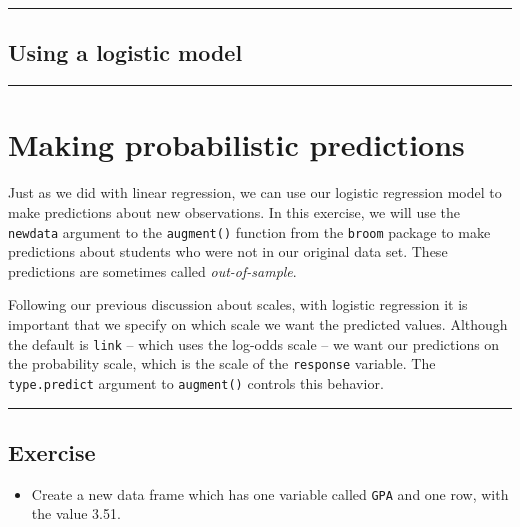 \documentclass[
]{book}
\providecommand{\tightlist}{%
  \setlength{\itemsep}{0pt}\setlength{\parskip}{0pt}}
\begin{document}
\begin{center}\rule{0.5\linewidth}{0.5pt}\end{center}

\hypertarget{using-a-logistic-model}{%
\subsection*{Using a logistic model}\label{using-a-logistic-model}}

\begin{center}\rule{0.5\linewidth}{0.5pt}\end{center}

\hypertarget{making-probabilistic-predictions}{%
\section{Making probabilistic predictions}\label{making-probabilistic-predictions}}

Just as we did with linear regression, we can use our logistic regression model to make predictions about new observations. In this exercise, we will use the \texttt{newdata} argument to the \texttt{augment()} function from the \texttt{broom} package to make predictions about students who were not in our original data set. These predictions are sometimes called \emph{out-of-sample}.

Following our previous discussion about scales, with logistic regression it is important that we specify on which scale we want the predicted values. Although the default is \texttt{link} -- which uses the log-odds scale -- we want our predictions on the probability scale, which is the scale of the \texttt{response} variable. The \texttt{type.predict} argument to \texttt{augment()} controls this behavior.

\begin{center}\rule{0.5\linewidth}{0.5pt}\end{center}

\hypertarget{exercise-19}{%
\subsection*{Exercise}\label{exercise-19}}

\begin{itemize}
\tightlist
\item
  Create a new data frame which has one variable called \texttt{GPA} and one row, with the value 3.51.
\end{itemize}
\end{document}
